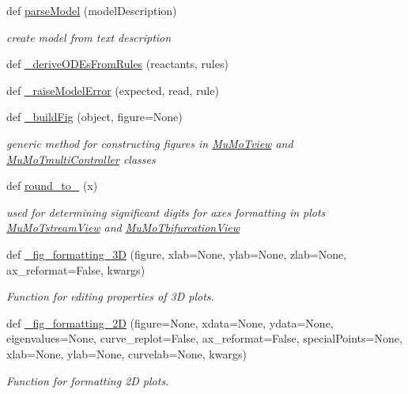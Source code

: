 \begin{DoxyCompactItemize}
\item 
def \hyperlink{namespace_mu_mo_t_a563aad4a460dbcc0705cf99bb6f6dd5d}{parse\+Model} (model\+Description)
\begin{DoxyCompactList}\small\item\em create model from text description \end{DoxyCompactList}\item 
def \hyperlink{namespace_mu_mo_t_a276566fb102dd4e4bf32a9ba4fb8a09b}{\+\_\+derive\+O\+D\+Es\+From\+Rules} (reactants, rules)
\item 
def \hyperlink{namespace_mu_mo_t_a07dd350ff74bc1abafd7f44f972089a2}{\+\_\+raise\+Model\+Error} (expected, read, rule)
\item 
def \hyperlink{namespace_mu_mo_t_a4cf5ca1427b0999c933587bfaa89936d}{\+\_\+build\+Fig} (object, figure=None)
\begin{DoxyCompactList}\small\item\em generic method for constructing figures in \hyperlink{class_mu_mo_t_1_1_mu_mo_tview}{Mu\+Mo\+Tview} and \hyperlink{class_mu_mo_t_1_1_mu_mo_tmulti_controller}{Mu\+Mo\+Tmulti\+Controller} classes \end{DoxyCompactList}\item 
def \hyperlink{namespace_mu_mo_t_a01b242770585ffc6064b5c618f38d87c}{round\+\_\+to\+\_} (x)
\begin{DoxyCompactList}\small\item\em used for determining significant digits for axes formatting in plots \hyperlink{class_mu_mo_t_1_1_mu_mo_tstream_view}{Mu\+Mo\+Tstream\+View} and \hyperlink{class_mu_mo_t_1_1_mu_mo_tbifurcation_view}{Mu\+Mo\+Tbifurcation\+View} \end{DoxyCompactList}\item 
def \hyperlink{namespace_mu_mo_t_a35eaa446589326bb98bc0978be4e368f}{\+\_\+fig\+\_\+formatting\+\_\+3D} (figure, xlab=None, ylab=None, zlab=None, ax\+\_\+reformat=False, kwargs)
\begin{DoxyCompactList}\small\item\em Function for editing properties of 3D plots. \end{DoxyCompactList}\item 
def \hyperlink{namespace_mu_mo_t_aa6bfa694d197771fda158f6e3b278293}{\+\_\+fig\+\_\+formatting\+\_\+2D} (figure=None, xdata=None, ydata=None, eigenvalues=None, curve\+\_\+replot=False, ax\+\_\+reformat=False, special\+Points=None, xlab=None, ylab=None, curvelab=None, kwargs)
\begin{DoxyCompactList}\small\item\em Function for formatting 2D plots. \end{DoxyCompactList}\end{DoxyCompactItemize}
